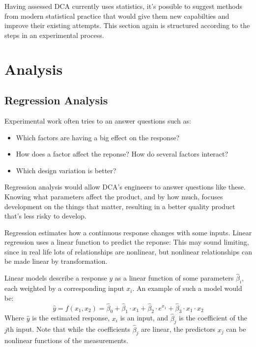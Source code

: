 \documentclass[11pt,a4paper,article]{memoir} %
\begin{document}
Having assessed DCA currently uses statistics, it's possible to suggest methods from modern statistical practice that would give them new capabilties and improve their existing attempts. This section again is structured according to the steps in an experimental process.

\section{Analysis}
\subsection*{Regression Analysis}
Experimental work often tries to an answer questions such as:
\vspace{-10pt}
\begin{itemize}
\item Which factors are having a big effect on the response?
\item How does a factor affect the reponse? How do several factors interact?
\item Which design variation is better?
\end{itemize}
\vspace{-10pt}
 Regression analysis would allow DCA's engineers to answer questions like these. Knowing what parameters affect the product, and by how much,  focuses development on the things that matter, resulting in a better quality product that's less risky to develop.
 \par
 Regression estimates how a continuous response changes with some inputs. Linear regression uses a linear function to predict the reponse: This may sound limiting, since in real life lots of relationships are nonlinear, but nonlinear relationships can be made linear by transformation.
\par
  Linear models describe a response $y$ as a linear function of some parameters $\hat{\beta}_i$, each weighted by a corresponding input $x_i$. An example of such a model would be:
\begin{equation}
	\hat{y} = f(x_1, x_2) = \hat{\beta}_0 + \hat{\beta}_1 \cdot x_1 + \hat{\beta}_2 \cdot e^{x_1}+ \hat{\beta}_3 \cdot x_1 \cdot x_2
\end{equation}
Where $\hat{y}$ is the estimated response, $x_i$ is an input, and $\hat{\beta}_j$ is the coefficient of the $j$th input. Note that while the coefficients $\hat{\beta}_j$ are linear, the predictors $x_j$ can be nonlinear functions of the measurements.
\end{document}
